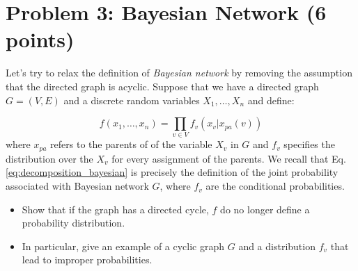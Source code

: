 \documentclass[10pt]{article}
\begin{document}
\section{Problem 3: Bayesian Network (6 points)}
Let's try to relax the definition of \emph{Bayesian network} by removing the
assumption that the directed graph is acyclic. Suppose that we have a directed
graph $G = (V,E)$ and a discrete random variables $X_1,\ldots, X_n$ and define:

\begin{equation}
  \label{eq:decomposition_bayesian}
  f(x_1,\ldots,x_n) = \prod_{v \in V} f_v(x_v| x_{pa}(v))
\end{equation}
where $x_{pa}$ refers to the parents of of the variable $X_v$ in $G$ and $f_v$
specifies the distribution over the $X_v$ for every assignment of the parents.
We recall that Eq.\ref{eq:decomposition_bayesian} is  precisely the definition
of the joint probability associated with Bayesian network $G$, where $f_v$ are
the conditional probabilities.

\begin{itemize}
  \item Show that if the graph has a directed cycle, $f$ do no longer define a
    probability distribution.
    \item In particular, give an example of a cyclic graph $G$ and a
      distribution $f_v$ that lead to improper probabilities.
  \end{itemize}
\end{document}
